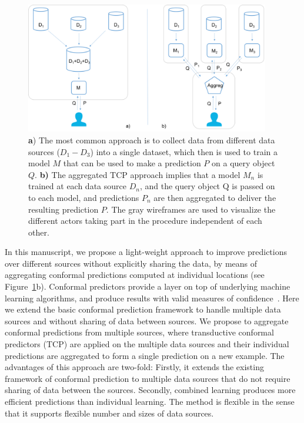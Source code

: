 \documentclass[main]{subfiles}
\begin{document}
 \begin{figure}[b!]
    \includegraphics[width=0.95\textwidth]{images/fig-overview.png}
    \caption{\textbf{a}) The most common approach is to collect data from different data sources ($D_1-D_3$) into a single dataset, which then is used to train a model $M$ that can be used to make a prediction $P$ on a query object $Q$. \textbf{b)} The aggregated TCP approach implies that a model $M_n$ is trained at each data source $D_n$, and the query object Q is passed on to each model, and predictions $P_n$ are then aggregated to deliver the resulting prediction $P$. The gray wireframes are used to visualize the different actors taking part in the procedure independent of each other.}
  \label{fig:overview}
\end{figure}

In this manuscript, we propose a light-weight approach to improve predictions over different sources without explicitly sharing the data, by means of aggregating conformal predictions computed at individual locations (see Figure~\ref{fig:overview}b). 
Conformal predictors provide a layer on top of underlying machine learning algorithms, and produce results with valid measures of confidence~\cite{vovk2005algorithmic}.
Here we extend the basic conformal prediction framework to handle multiple data sources and without sharing of data between sources. We propose to aggregate conformal predictions from multiple sources, where transductive conformal predictors (TCP) are applied on the multiple data sources and their individual predictions are aggregated to form a single prediction on a new example.
The advantages of this approach are two-fold: 
Firstly, it extends the existing framework of conformal prediction to multiple data sources that do not require sharing of data between the sources. Secondly, combined learning produces more efficient predictions than individual learning. The method is flexible in the sense that it supports flexible number and sizes of data sources.
\end{document}
